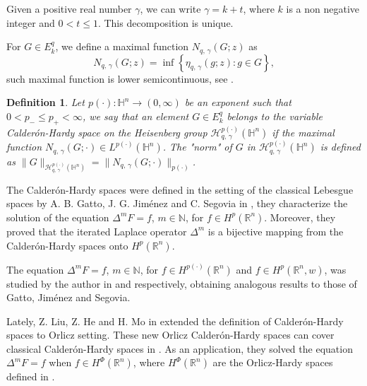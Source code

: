 \documentclass[oneside,10pt]{article}
\newtheorem{definition}[theorem]{Definition}
\begin{document}
Given a positive real number $\gamma$, we can write $\gamma = k + t$, where $k$ is a non negative integer and $0 < t \leq 1$. This decomposition is unique.

For $G \in E^{q}_{k}$, we define a maximal function $N_{q, \, \gamma}(G; z)$ as 
\begin{equation} \label{Nmax}
N_{q, \, \gamma}(G; z) = \inf \left\{ \eta_{q, \, \gamma}(g; z) : g \in G \right\},
\end{equation}
such maximal function is lower semicontinuous, see \cite[Lemma 9]{rocha5}.

\begin{definition} \label{var cal-hardy}
Let $p(\cdot) : \mathbb{H}^{n} \rightarrow (0, \infty)$ be an exponent such that $0< p_{-} \leq p_{+} < \infty$, we say 
that an element $G \in E^{q}_{k}$ belongs to the variable Calder\'on-Hardy space on the Heisenberg group 
$\mathcal{H}^{p(\cdot)}_{q, \, \gamma}(\mathbb{H}^{n})$ if the maximal function 
$N_{q, \, \gamma}(G; \cdot) \in L^{p(\cdot)}(\mathbb{H}^{n})$. The "norm" of $G$ in $\mathcal{H}^{p(\cdot)}_{q, \, \gamma}(\mathbb{H}^{n})$ is defined as $\| G \|_{\mathcal{H}^{p(\cdot)}_{q, \, \gamma}(\mathbb{H}^{n})} = \| N_{q, \, \gamma}(G; \cdot) \|_{p(\cdot)}$.
\end{definition}


The Calder\'on-Hardy spaces were defined in the setting of the classical Lebesgue spaces by A. B. Gatto, J. G. Jim\'enez and C. Segovia in \cite{segovia}, they characterize the solution of the equation $\Delta^{m} F = f$, $m \in \mathbb{N}$, for $f \in H^{p}(\mathbb{R}^{n})$. Moreover, they proved that the iterated Laplace operator $\Delta^{m}$ is a bijective mapping from the Calder\'on-Hardy spaces onto $H^{p}(\mathbb{R}^{n})$. 

The equation $\Delta^{m} F = f$, $m \in \mathbb{N}$, for $f \in H^{p(\cdot)}(\mathbb{R}^{n})$ and $f \in H^{p}(\mathbb{R}^{n}, w)$, 
was studied by the author in \cite{rocha1} and \cite{rocha3} respectively, obtaining analogous results to those of Gatto, Jim\'enez and Segovia. %

Lately, Z. Liu, Z. He and H. Mo in \cite{He} extended the definition of Calder\'on-Hardy spaces to Orlicz setting. These new Orlicz 
Calder\'on-Hardy spaces can cover classical Calder\'on-Hardy spaces in \cite{segovia}. As an application, they solved the equation 
$\Delta^{m} F = f$ when $f \in H^{\Phi}(\mathbb{R}^{n})$, where $H^{\Phi}(\mathbb{R}^{n})$ are the Orlicz-Hardy spaces defined 
in \cite{Nakai}.
\end{document}
